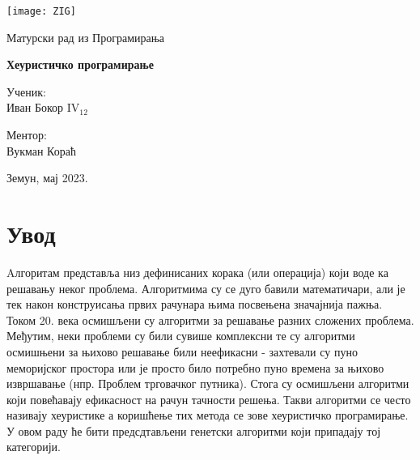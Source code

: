 \documentclass{article}
\begin{document}

\thispagestyle{empty}

\graphicspath{{./images/}}

\begin{center}
    \texttt{[image: ZIG]}
\end{center}

\vspace*{20mm}

\begin{center}
    \Large Матурски рад из Програмирања

    \vspace*{8pt}

    \Huge \textbf{Хеуристичко програмирање}
\end{center}

\vspace*{40mm}

\setlength{\columnsep}{50pt}
\begin{multicols}{2}
 {\noindent \large Ученик:
\\Иван Бокор  IV$_{12}$}

 {\noindent \hfill \large \centering{}Ментор: \\
 \hfill \phantom{111} Вукман Кораћ}

\end{multicols}

\vfill

\begin{center}
    \Large Земун, мај 2023.
\end{center}

\newpage


\tableofcontents


\newpage
{}

\section{Увод}

Aлгоритам представља низ дефинисаних корака (или операција) који воде ка
решавању неког проблема. Алгоритмима су се дуго бавили математичари, али је 
тек након конструисања првих рачунара њима посвењена значајнија пажња. Током 
20. века осмишљени су алгоритми за решавање разних сложених проблема.  Међутим,
неки проблеми су били сувише комплексни те су алгоритми осмишњени за њихово
решавање били неефикасни - захтевали су пуно меморијског простора или је просто 
било потребно пуно времена за њихово извршавање (нпр. Проблем трговачког путника).
Стога су осмишљени алгоритми који повећавају ефикасност на рачун тачности решења.
Такви алгоритми се често називају хеуристике а коришћење тих метода се зове хеуристичко програмирање.
У овом раду ће бити предсдтављени генетски алгоритми који припадају тој категорији.
\end{document}
